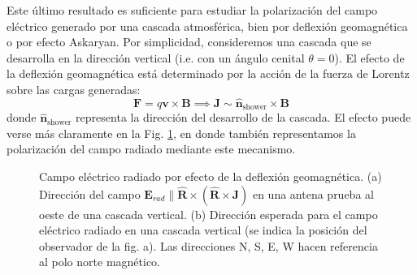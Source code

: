 \documentclass[12 pt, a4paper]{article} %
\numberwithin{equation}{section}
\numberwithin{figure}{section}
\numberwithin{table}{section}
\newcommand{\vect}[1]{\boldsymbol{\mathbf{#1}}}
\begin{document}
Este último resultado es suficiente para estudiar la polarización del campo eléctrico generado por una cascada atmosférica, bien por deflexión geomagnética o por efecto Askaryan. Por simplicidad, consideremos una cascada que se desarrolla en la dirección vertical (i.e. con un ángulo cenital $\theta=0$). El efecto de la deflexión geomagnética está determinado por la acción de la fuerza de Lorentz sobre las cargas generadas:
\begin{equation}
	\vect{F}=q\vect{v}\times \vect{B}\implies \vect{J}\sim \hat{\vect{n}}_{\text{shower}}\times\vect{B}\label{ec38}
\end{equation}
donde $\hat{\vect{n}}_{\text{shower}}$ representa la dirección del desarrollo de la cascada. El efecto puede verse más claramente en la Fig. \ref{Geomag_deflexion}, en donde también representamos la polarización del campo radiado mediante este mecanismo.

\newpage
\begin{figure}[H]
	\centering
	\hspace{10mm}
	\caption{Campo eléctrico radiado por efecto de la deflexión geomagnética. (a) Dirección del campo $\vect{E}_{rad}\parallel  \hat{\vect{R}}\times\left(\hat{\vect{R}}\times\vect{J}\right)$ en una antena prueba al oeste de una cascada vertical. (b) Dirección esperada para el campo eléctrico radiado en una cascada vertical (se indica la posición del observador de la fig. a). Las direcciones N, S, E, W hacen referencia al polo norte magnético.}
	\label{Geomag_deflexion}
\end{figure}
\end{document}
